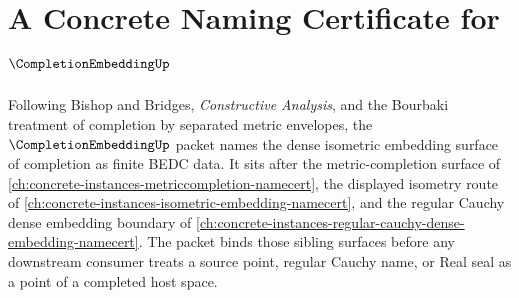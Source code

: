\chapter{A Concrete Naming Certificate for $\CompletionEmbeddingUp$}
\label{ch:concrete-instances-completionembedding-namecert}

Following Bishop and Bridges, \emph{Constructive Analysis}, and the Bourbaki treatment of completion by separated metric envelopes, the $\CompletionEmbeddingUp$ packet names the dense isometric embedding surface of completion as finite BEDC data. It sits after the metric-completion surface of \autoref{ch:concrete-instances-metriccompletion-namecert}, the displayed isometry route of \autoref{ch:concrete-instances-isometric-embedding-namecert}, and the regular Cauchy dense embedding boundary of \autoref{ch:concrete-instances-regular-cauchy-dense-embedding-namecert}. The packet binds those sibling surfaces before any downstream consumer treats a source point, regular Cauchy name, or Real seal as a point of a completed host space.

